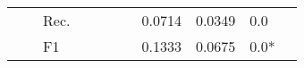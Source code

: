 \begin{tabular}{cclllllllll}
                                                                                                               &                                   & Rec.                                                 &                         &                         &                              &                         & 0.0714                                                                       & 0.0349                                                                      & 0.0                                       &                                           \\
                                                                                                               &                                   & F1                                                   &                         &                         &                              &                         & 0.1333                                                                       & 0.0675                                                                      & 0.0*                                      &                                           \\
    \bottomrule
    \end{tabular}